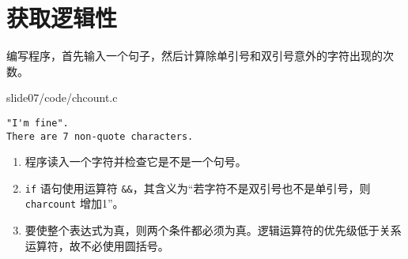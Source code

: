 \section{获取逻辑性}

\begin{frame}[fragile]\ft{\secname}
\begin{free}[例]{}
编写程序，首先输入一个句子，然后计算除单引号和双引号意外的字符出现的次数。
\end{free}
\end{frame}

\begin{frame}[fragile]\ft{\secname}
  
  {slide07/code/chcount.c}
\end{frame}

\begin{frame}[fragile]\ft{\secname}
\begin{lstlisting}[backgroundcolor=\color{red!10}]
"I'm fine".
There are 7 non-quote characters.
\end{lstlisting}

\end{frame}

\begin{frame}[fragile]\ft{\secname}
\begin{enumerate}
\item 程序读入一个字符并检查它是不是一个句号。\\[0.1in]
\item \lstinline|if| 语句使用运算符 \lstinline|&&|，其含义为“若字符不是双引号也不是单引号，则 \lstinline|charcount| 增加1”。\\[0.1in]
\item 要使整个表达式为真，则两个条件都必须为真。逻辑运算符的优先级低于关系运算符，故不必使用圆括号。
\end{enumerate}
\end{frame}

